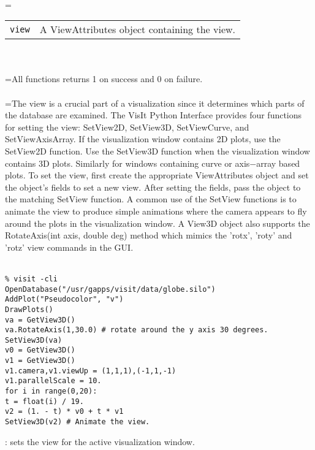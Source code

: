 \documentclass[10pt,a4paper]{report}
\begin{document}
 \\ 
\hangindent=\parindent 
\begin{tabular}{lp{9cm}}
\verb!view! & A ViewAttributes object containing the view. \\
\end{tabular} \\[-2mm]


 \\ 
\hangindent=\parindent All functions returns 1 on success and 0 on failure. \\[-3mm] 

 \\ 
\hangindent=\parindent The view is a crucial part of a visualization since it determines which parts of the database are examined. The VisIt Python Interface provides four functions for setting the view: SetView2D, SetView3D, SetViewCurve, and SetViewAxisArray. If the visualization window contains 2D plots, use the SetView2D function. Use the SetView3D function when the visualization window contains 3D plots.  Similarly for windows containing curve or axis$-$array based plots.  To set the view, first create the appropriate ViewAttributes object and set the object's fields to set a new view. After setting the fields, pass the object to the matching SetView function. A common use of the SetView functions is to animate the view to produce simple animations where the camera appears to fly around the plots in the visualization window. A View3D object also supports the RotateAxis(int axis, double deg) method which mimics the 'rotx', 'roty' and 'rotz' view commands in the GUI. \\[-3mm] 

\\[-6mm]
\begin{verbatim}% visit -cli
OpenDatabase("/usr/gapps/visit/data/globe.silo")
AddPlot("Pseudocolor", "v")
DrawPlots()
va = GetView3D()
va.RotateAxis(1,30.0) # rotate around the y axis 30 degrees.
SetView3D(va)
v0 = GetView3D()
v1 = GetView3D()
v1.camera,v1.viewUp = (1,1,1),(-1,1,-1)
v1.parallelScale = 10.
for i in range(0,20):
t = float(i) / 19.
v2 = (1. - t) * v0 + t * v1
SetView3D(v2) # Animate the view.
\end{verbatim}
\newpage


{}
: sets the view for the active visualization window.\\[-3mm]
\end{document}
